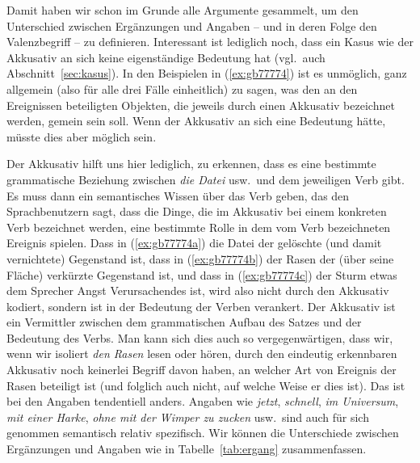 \begin{exe}
  \ex\label{ex:gb01274}
  \begin{xlist}
  \end{xlist}
\end{exe}

Damit haben wir schon im Grunde alle Argumente gesammelt, um den Unterschied zwischen Ergänzungen und Angaben -- und in deren Folge den Valenzbegriff -- zu definieren.
Interessant ist lediglich noch, dass ein Kasus wie der Akkusativ an sich keine eigenständige Bedeutung hat (vgl.\ auch Abschnitt~\ref{sec:kasus}).
In den Beispielen in (\ref{ex:gb77774}) ist es unmöglich, ganz allgemein (also für alle drei Fälle einheitlich) zu sagen, was den an den Ereignissen beteiligten Objekten, die jeweils durch einen Akkusativ bezeichnet werden, gemein sein soll.
Wenn der Akkusativ an sich eine Bedeutung hätte, müsste dies aber möglich sein.

\begin{exe}
  \ex\label{ex:gb77774}
  \begin{xlist}
  \end{xlist}
\end{exe}

Der Akkusativ hilft uns hier lediglich, zu erkennen, dass es eine bestimmte grammatische Beziehung zwischen \textit{die Datei} usw.\ und dem jeweiligen Verb gibt.
Es muss dann ein semantisches Wissen über das Verb geben, das den Sprachbenutzern sagt, dass die Dinge, die im Akkusativ bei einem konkreten Verb bezeichnet werden, eine bestimmte Rolle in dem vom Verb bezeichneten Ereignis spielen.
Dass in (\ref{ex:gb77774a}) die Datei der gelöschte (und damit vernichtete) Gegenstand ist, dass in (\ref{ex:gb77774b}) der Rasen der (über seine Fläche) verkürzte Gegenstand ist, und dass in (\ref{ex:gb77774c}) der Sturm etwas dem Sprecher Angst Verursachendes ist, wird also nicht durch den Akkusativ kodiert, sondern ist in der Bedeutung der Verben verankert.
Der Akkusativ ist ein Vermittler zwischen dem grammatischen Aufbau des Satzes und der Bedeutung des Verbs.
Man kann sich dies auch so vergegenwärtigen, dass wir, wenn wir isoliert \textit{den Rasen} lesen oder hören, durch den eindeutig erkennbaren Akkusativ noch keinerlei Begriff davon haben, an welcher Art von Ereignis der Rasen beteiligt ist (und folglich auch nicht, auf welche Weise er dies ist).
Das ist bei den Angaben tendentiell anders.
Angaben wie \textit{jetzt}, \textit{schnell}, \textit{im Universum}, \textit{mit einer Harke}, \textit{ohne mit der Wimper zu zucken} usw.\ sind auch für sich genommen semantisch relativ spezifisch.
Wir können die Unterschiede zwischen Ergänzungen und Angaben wie in Tabelle~\ref{tab:ergang} zusammenfassen.

